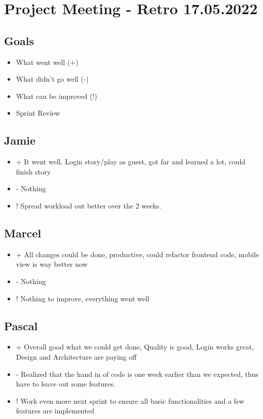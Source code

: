 \section{Project Meeting - Retro 17.05.2022}

\subsection{Goals}
\begin{itemize}
    \item What went well (+)
    \item What didn't go well (-)
    \item What can be improved (!)
    \item Sprint Review
\end{itemize}

\subsection{Jamie}
\begin{itemize}
    \item + It went well, Login story/play as guest, got far and learned a lot, could finish story
    \item - Nothing
    \item ! Spread workload out better over the 2 weeks.
\end{itemize}

\subsection{Marcel}
\begin{itemize}
    \item + All changes could be done, productive, could refactor frontend code, mobile view is way better now
    \item - Nothing
    \item ! Nothing to improve, everything went well
\end{itemize}

\subsection{Pascal}
\begin{itemize}
    \item + Overall good what we could get done, Quality is good, Login works great, Design and Architecture are paying off
    \item - Realized that the hand in of code is one week earlier than we expected, thus have to leave out some features.
    \item ! Work even more next sprint to ensure all basic functionalities and a few features are implemented
\end{itemize}

